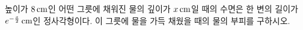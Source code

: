 \hspace*{2mm}\begin{minipage}[t]{\dimexpr\linewidth-2mm\relax}\vspace{0pt}
높이가 $8\mkern3mu \mathrm{cm}$인 어떤 그릇에 채워진 물의 깊이가 $x\mkern3mu \mathrm{cm}$일 때의 수면은 한 변의 길이가 $e^{-\frac{x}{2}}\mkern3mu \mathrm{cm}$인 정사각형이다. 이 그릇에 물을 가득 채웠을 때의 물의 부피를 구하시오.\end{minipage}
